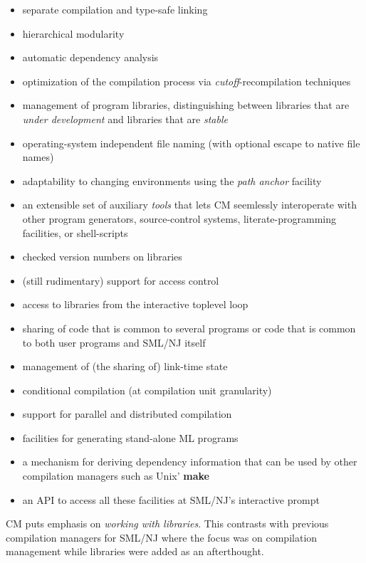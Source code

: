 \documentclass[titlepage,letterpaper]{article}
\begin{document}
\begin{itemize}
\item separate compilation and type-safe linking~\cite{appel94:sepcomp}
\item hierarchical modularity~\cite{blume:appel:cm99}
\item automatic dependency analysis~\cite{blume:depend99}
\item optimization of the compilation process via {\em
cutoff}-recompilation techniques~\cite{tichy94}
\item management of program libraries, distinguishing between libraries
that are {\em under development} and libraries that are {\em stable}
\item operating-system independent file naming (with optional escape
to native file names)
\item adaptability to changing environments using the {\em path anchor}
facility
\item an extensible set of auxiliary {\em tools} that lets CM
seemlessly interoperate with other program generators, source-control
systems, literate-programming facilities, or shell-scripts
\item checked version numbers on libraries
\item (still rudimentary) support for access control
\item access to libraries from the interactive toplevel loop
\item sharing of code that is common to several programs or code that
is common to both user programs and SML/NJ itself
\item management of (the sharing of) link-time state
\item conditional compilation (at compilation unit granularity)
\item support for parallel and distributed compilation
\item facilities for generating stand-alone ML programs
\item a mechanism for deriving dependency information that can be used
by other compilation managers such as Unix' {\bf make}
\item an API to access all these facilities at SML/NJ's interactive
prompt
\end{itemize}

CM puts emphasis on {\em working with libraries}.  This contrasts with
previous compilation managers for SML/NJ where the focus was on
compilation management while libraries were added as an afterthought.
\end{document}
